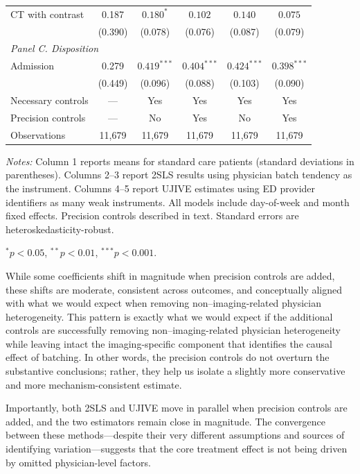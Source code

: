 \documentclass[11pt]{article}
\newcommand{\1}{\hbox{\rm 1\kern-.35em 1}}
\begin{document}
\begin{table}[t!]
\begin{threeparttable}
\begin{tabular}{lccccc}
CT with contrast 
& 0.187
& $0.180^{*}$ & $0.102$
& $0.140$ & $0.075$ \\
& (0.390)
& (0.078) & (0.076)
& (0.087) & (0.079) \\[0.5em]
\multicolumn{6}{l}{\textit{Panel C. Disposition}} \\[0.5em]
Admission 
& 0.279
& $0.419^{***}$ & $0.404^{***}$
& $0.424^{***}$ & $0.398^{***}$ \\
& (0.449)
& (0.096) & (0.088)
& (0.103) & (0.090) \\[0.5em]
\midrule
Necessary controls & --- & Yes & Yes & Yes & Yes \\
Precision controls & --- & No & Yes & No & Yes \\
Observations & 11,679 & 11,679 & 11,679 & 11,679 & 11,679 \\
\bottomrule
\end{tabular}
\begin{flushleft}
\footnotesize
\textit{Notes:} Column 1 reports means for standard care patients (standard deviations in parentheses). Columns 2–3 report 2SLS results using physician batch tendency as the instrument. Columns 4–5 report UJIVE estimates using ED provider identifiers as many weak instruments. All models include day-of-week and month fixed effects. Precision controls described in text. Standard errors are heteroskedasticity-robust.
\item $^{*} p < 0.05$, $^{**} p < 0.01$, $^{***} p < 0.001$.
\end{flushleft}
\end{threeparttable}
\end{table}

While some coefficients shift in magnitude when precision controls are added, these shifts are moderate, consistent across outcomes, and conceptually aligned with what we would expect when removing non–imaging-related physician heterogeneity. This pattern is exactly what we would expect if the additional controls are successfully removing non–imaging-related physician heterogeneity while leaving intact the imaging-specific component that identifies the causal effect of batching. In other words, the precision controls do not overturn the substantive conclusions; rather, they help us isolate a slightly more conservative and more mechanism-consistent estimate.

Importantly, both 2SLS and UJIVE move in parallel when precision controls are added, and the two estimators remain close in magnitude. The convergence between these methods—despite their very different assumptions and sources of identifying variation—suggests that the core treatment effect is not being driven by omitted physician-level factors.
\end{document}
